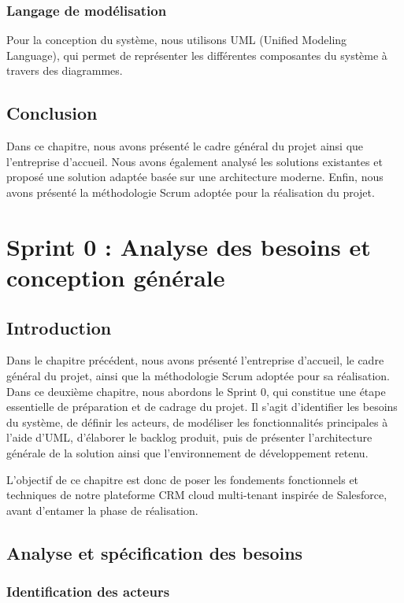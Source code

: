 \documentclass[12pt,a4paper]{report}
\begin{document}
\subsection{Langage de modélisation}

Pour la conception du système, nous utilisons UML (Unified Modeling Language), qui permet de représenter les différentes composantes du système à travers des diagrammes.

\section*{Conclusion}

Dans ce chapitre, nous avons présenté le cadre général du projet ainsi que l’entreprise d’accueil. Nous avons également analysé les solutions existantes et proposé une solution adaptée basée sur une architecture moderne. Enfin, nous avons présenté la méthodologie Scrum adoptée pour la réalisation du projet.

\chapter{Sprint 0 : Analyse des besoins et conception générale}

\section*{Introduction}

Dans le chapitre précédent, nous avons présenté l’entreprise d’accueil, le cadre général du projet, ainsi que la méthodologie Scrum adoptée pour sa réalisation. Dans ce deuxième chapitre, nous abordons le Sprint 0, qui constitue une étape essentielle de préparation et de cadrage du projet. Il s’agit d’identifier les besoins du système, de définir les acteurs, de modéliser les fonctionnalités principales à l’aide d’UML, d’élaborer le backlog produit, puis de présenter l’architecture générale de la solution ainsi que l’environnement de développement retenu.

L’objectif de ce chapitre est donc de poser les fondements fonctionnels et techniques de notre plateforme CRM cloud multi-tenant inspirée de Salesforce, avant d’entamer la phase de réalisation.

\section{Analyse et spécification des besoins}

\subsection{Identification des acteurs}
\end{document}
